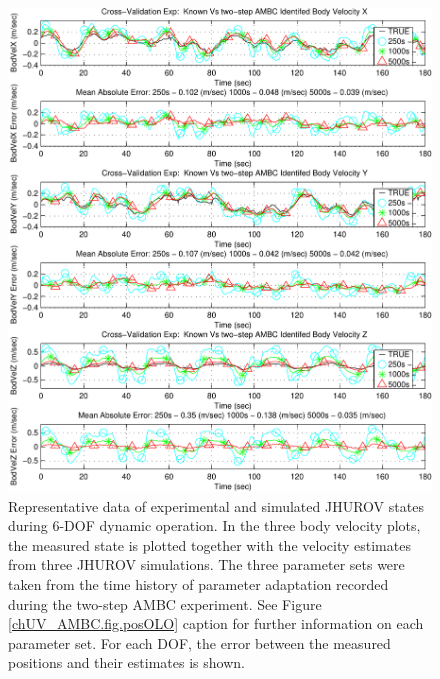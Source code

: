 \begin{center}
\begin{figure}[htbp]
  \begin{center}
    \includegraphics[width=150mm]{./chUV_AMBC/images/OLO_bodyVel}
  \end{center}
  \caption{ Representative data of experimental and simulated
    \ac{JHUROV} states during 6-\ac{DOF} dynamic operation.  In the
    three body velocity plots, the measured state is plotted together
    with the velocity estimates from three \ac{JHUROV}
    simulations. The three parameter sets were taken from the time
    history of parameter adaptation recorded during the two-step
    \ac{AMBC} experiment.  See Figure \ref{chUV_AMBC.fig.posOLO}
    caption for further information on each parameter set.  For each
    \ac{DOF}, the error between the measured positions and their
    estimates is shown.  }
  \label{chUV_AMBC.fig.bodVelOLO}
\end{figure}
\end{center}
 

